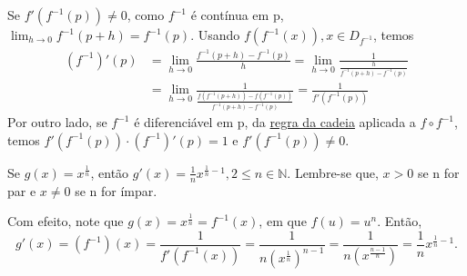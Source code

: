 \documentclass[Analysis/analysis_notes.tex]{subfiles}
\begin{document}
\begin{proof*}
	Se \(f'(f^{-1}(p))\neq0\), como \(f^{-1}\) é contínua em p, \(\lim_{h\to 0}f^{-1}(p+h)=f^{-1}(p)\).
	Usando \(f(f^{-1}(x)), x\in D_{f^{-1}}\), temos
	\begin{align*}
		(f^{-1})'(p) & = \lim_{h\to 0}\frac{f^{-1}(p+h)-f^{-1}(p)}{h} = \lim_{h\to 0}\frac{1}{\frac{h}{f^{-1}(p+h)-f^{-1}(p)}}      \\
		             & = \lim_{h\to 0}\frac{1}{\frac{f(f^{-1}(p+h))-f(f^{-1}(p))}{f^{-1}(p+h)-f^{-1}(p)}} = \frac{1}{f'(f^{-1}(p))}
	\end{align*}
	Por outro lado, se \(f^{-1}\) é diferenciável em p, da \hyperlink{chain_rule}{regra da cadeia}
	aplicada a \(f\circ{f^{-1}}\), temos \(f'(f^{-1}(p))\cdot (f^{-1})'(p)=1\) e \(f'(f^{-1}(p))\neq0\).
\end{proof*}
\begin{example}
	Se \(g(x)=x^{\frac{1}{n}}\), então \(g'(x) = \frac{1}{n}x^{\frac{1}{n}-1}, 2\leq n\in \mathbb{N}\).
	Lembre-se que, \(x > 0\) se n for par e \(x\neq0\) se n for ímpar.

	Com efeito, note que \(g(x) = x^{\frac{1}{n}} = f^{-1}(x)\), em que \(f(u) = u^n.\) Então,
	\[
		g'(x) = (f^{-1})(x) = \frac{1}{f'(f^{-1}(x))} = \frac{1}{n(x^{\frac{1}{n}})^{n-1}} = \frac{1}{n(x^{\frac{n-1}{n}})} = \frac{1}{n}x^{\frac{1}{n}-1}.
	\]
\end{example}
\end{document}
